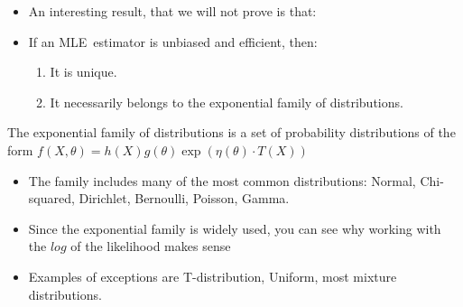\documentclass[notes=show]{beamer}
\begin{document}
\begin{frame}%


\begin{itemize}
\item An interesting result, that we will not prove is that:

\item If an MLE\ estimator is unbiased and efficient, then:

\begin{enumerate}
\item It is unique.

\item It necessarily belongs to the exponential family of distributions.
\end{enumerate}
\end{itemize}

\begin{definition}
The exponential family of distributions is a set of probability
distributions of the form $f(X,\theta )=h(X)g(\theta )\exp (\eta (\theta
)\cdot T(X))$
\end{definition}

\begin{itemize}
\item The family includes many of the most common distributions: Normal,
Chi-squared, Dirichlet, Bernoulli, Poisson, Gamma.

\item Since the exponential family is widely used, you can see why working
with the $log$ of the likelihood makes sense

\item Examples of exceptions are T-distribution, Uniform, most mixture
distributions.
\end{itemize}

\end{frame}%
\end{document}
